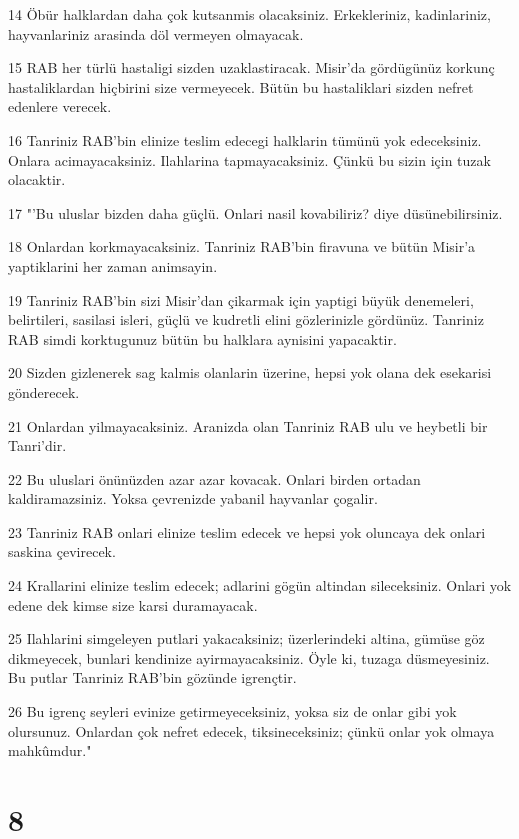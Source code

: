 \par 14 Öbür halklardan daha çok kutsanmis olacaksiniz. Erkekleriniz, kadinlariniz, hayvanlariniz arasinda döl vermeyen olmayacak.
\par 15 RAB her türlü hastaligi sizden uzaklastiracak. Misir'da gördügünüz korkunç hastaliklardan hiçbirini size vermeyecek. Bütün bu hastaliklari sizden nefret edenlere verecek.
\par 16 Tanriniz RAB'bin elinize teslim edecegi halklarin tümünü yok edeceksiniz. Onlara acimayacaksiniz. Ilahlarina tapmayacaksiniz. Çünkü bu sizin için tuzak olacaktir.
\par 17 "'Bu uluslar bizden daha güçlü. Onlari nasil kovabiliriz? diye düsünebilirsiniz.
\par 18 Onlardan korkmayacaksiniz. Tanriniz RAB'bin firavuna ve bütün Misir'a yaptiklarini her zaman animsayin.
\par 19 Tanriniz RAB'bin sizi Misir'dan çikarmak için yaptigi büyük denemeleri, belirtileri, sasilasi isleri, güçlü ve kudretli elini gözlerinizle gördünüz. Tanriniz RAB simdi korktugunuz bütün bu halklara aynisini yapacaktir.
\par 20 Sizden gizlenerek sag kalmis olanlarin üzerine, hepsi yok olana dek esekarisi gönderecek.
\par 21 Onlardan yilmayacaksiniz. Aranizda olan Tanriniz RAB ulu ve heybetli bir Tanri'dir.
\par 22 Bu uluslari önünüzden azar azar kovacak. Onlari birden ortadan kaldiramazsiniz. Yoksa çevrenizde yabanil hayvanlar çogalir.
\par 23 Tanriniz RAB onlari elinize teslim edecek ve hepsi yok oluncaya dek onlari saskina çevirecek.
\par 24 Krallarini elinize teslim edecek; adlarini gögün altindan sileceksiniz. Onlari yok edene dek kimse size karsi duramayacak.
\par 25 Ilahlarini simgeleyen putlari yakacaksiniz; üzerlerindeki altina, gümüse göz dikmeyecek, bunlari kendinize ayirmayacaksiniz. Öyle ki, tuzaga düsmeyesiniz. Bu putlar Tanriniz RAB'bin gözünde igrençtir.
\par 26 Bu igrenç seyleri evinize getirmeyeceksiniz, yoksa siz de onlar gibi yok olursunuz. Onlardan çok nefret edecek, tiksineceksiniz; çünkü onlar yok olmaya mahkûmdur."

\chapter{8}

